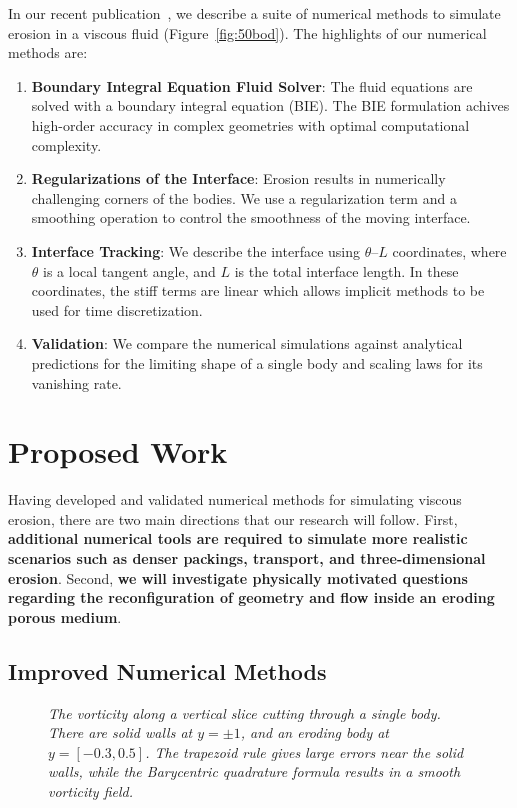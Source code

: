 \documentclass[11pt]{article}
\newcommand{\thL}{$\theta$--$L$}
\begin{document}
In our recent publication~\cite{qua-moo2018}, we describe a suite of
numerical methods to simulate erosion in a viscous fluid
(Figure~\ref{fig:50bod}).  The highlights of our numerical methods are:
\begin{enumerate}[topsep=0pt,itemsep=-1ex,partopsep=1ex,parsep=1ex]
  \item {\bf Boundary Integral Equation Fluid Solver}: The
  fluid equations are solved with a boundary integral equation (BIE).
  The BIE formulation achives high-order accuracy in complex geometries
  with optimal computational complexity.

  \item {\bf Regularizations of the Interface}: Erosion results in
  numerically challenging corners of the bodies.  We use a
  regularization term and a smoothing operation to control the
  smoothness of the moving interface.

  \item {\bf Interface Tracking}: We describe the interface using
  {\thL} coordinates, where $\theta$ is a local tangent angle, and $L$
  is the total interface length.  In these coordinates, the
  stiff terms are linear which allows implicit methods to be used for time discretization.

  \item {\bf Validation}: We compare the numerical simulations against analytical predictions for the limiting shape of a single body and scaling laws for its vanishing rate.
\end{enumerate}

\section{Proposed Work}
Having developed and validated numerical methods for simulating viscous
erosion, there are two main directions that our research will follow.
First, {\bf additional numerical tools are required to simulate more
realistic scenarios such as denser packings, transport, and
three-dimensional erosion}.  Second, {\bf we will investigate physically
motivated questions regarding the reconfiguration of geometry and flow inside an eroding
porous medium}.

\subsection{Improved Numerical Methods}
\begin{figure}
\centering

\caption{\label{fig:vort1} \em The vorticity along a vertical slice
cutting through a single body.  There are solid walls at $y = \pm 1$,
and an eroding body at $y = [-0.3,0.5]$.  The trapezoid rule gives large
errors near the solid walls, while the Barycentric quadrature formula
results in a smooth vorticity field.}
\end{figure}
\end{document}
